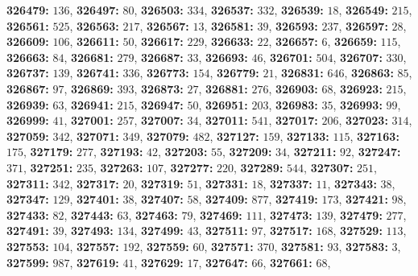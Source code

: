 \textsf{\bfseries 326479:} $136$, \textsf{\bfseries 326497:} $80$, \textsf{\bfseries 326503:} $334$, \textsf{\bfseries 326537:} $332$, \textsf{\bfseries 326539:} $18$, \textsf{\bfseries 326549:} $215$, \textsf{\bfseries 326561:} $525$, \textsf{\bfseries 326563:} $217$, \textsf{\bfseries 326567:} $13$, \textsf{\bfseries 326581:} $39$, \textsf{\bfseries 326593:} $237$, \textsf{\bfseries 326597:} $28$, \textsf{\bfseries 326609:} $106$, \textsf{\bfseries 326611:} $50$, \textsf{\bfseries 326617:} $229$, \textsf{\bfseries 326633:} $22$, \textsf{\bfseries 326657:} $6$, \textsf{\bfseries 326659:} $115$, \textsf{\bfseries 326663:} $84$, \textsf{\bfseries 326681:} $279$, \textsf{\bfseries 326687:} $33$, \textsf{\bfseries 326693:} $46$, \textsf{\bfseries 326701:} $504$, \textsf{\bfseries 326707:} $330$, \textsf{\bfseries 326737:} $139$, \textsf{\bfseries 326741:} $336$, \textsf{\bfseries 326773:} $154$, \textsf{\bfseries 326779:} $21$, \textsf{\bfseries 326831:} $646$, \textsf{\bfseries 326863:} $85$, \textsf{\bfseries 326867:} $97$, \textsf{\bfseries 326869:} $393$, \textsf{\bfseries 326873:} $27$, \textsf{\bfseries 326881:} $276$, \textsf{\bfseries 326903:} $68$, \textsf{\bfseries 326923:} $215$, \textsf{\bfseries 326939:} $63$, \textsf{\bfseries 326941:} $215$, \textsf{\bfseries 326947:} $50$, \textsf{\bfseries 326951:} $203$, \textsf{\bfseries 326983:} $35$, \textsf{\bfseries 326993:} $99$, \textsf{\bfseries 326999:} $41$, \textsf{\bfseries 327001:} $257$, \textsf{\bfseries 327007:} $34$, \textsf{\bfseries 327011:} $541$, \textsf{\bfseries 327017:} $206$, \textsf{\bfseries 327023:} $314$, \textsf{\bfseries 327059:} $342$, \textsf{\bfseries 327071:} $349$, \textsf{\bfseries 327079:} $482$, \textsf{\bfseries 327127:} $159$, \textsf{\bfseries 327133:} $115$, \textsf{\bfseries 327163:} $175$, \textsf{\bfseries 327179:} $277$, \textsf{\bfseries 327193:} $42$, \textsf{\bfseries 327203:} $55$, \textsf{\bfseries 327209:} $34$, \textsf{\bfseries 327211:} $92$, \textsf{\bfseries 327247:} $371$, \textsf{\bfseries 327251:} $235$, \textsf{\bfseries 327263:} $107$, \textsf{\bfseries 327277:} $220$, \textsf{\bfseries 327289:} $544$, \textsf{\bfseries 327307:} $251$, \textsf{\bfseries 327311:} $342$, \textsf{\bfseries 327317:} $20$, \textsf{\bfseries 327319:} $51$, \textsf{\bfseries 327331:} $18$, \textsf{\bfseries 327337:} $11$, \textsf{\bfseries 327343:} $38$, \textsf{\bfseries 327347:} $129$, \textsf{\bfseries 327401:} $38$, \textsf{\bfseries 327407:} $58$, \textsf{\bfseries 327409:} $877$, \textsf{\bfseries 327419:} $173$, \textsf{\bfseries 327421:} $98$, \textsf{\bfseries 327433:} $82$, \textsf{\bfseries 327443:} $63$, \textsf{\bfseries 327463:} $79$, \textsf{\bfseries 327469:} $111$, \textsf{\bfseries 327473:} $139$, \textsf{\bfseries 327479:} $277$, \textsf{\bfseries 327491:} $39$, \textsf{\bfseries 327493:} $134$, \textsf{\bfseries 327499:} $43$, \textsf{\bfseries 327511:} $97$, \textsf{\bfseries 327517:} $168$, \textsf{\bfseries 327529:} $113$, \textsf{\bfseries 327553:} $104$, \textsf{\bfseries 327557:} $192$, \textsf{\bfseries 327559:} $60$, \textsf{\bfseries 327571:} $370$, \textsf{\bfseries 327581:} $93$, \textsf{\bfseries 327583:} $3$, \textsf{\bfseries 327599:} $987$, \textsf{\bfseries 327619:} $41$, \textsf{\bfseries 327629:} $17$, \textsf{\bfseries 327647:} $66$, \textsf{\bfseries 327661:} $68$, 
